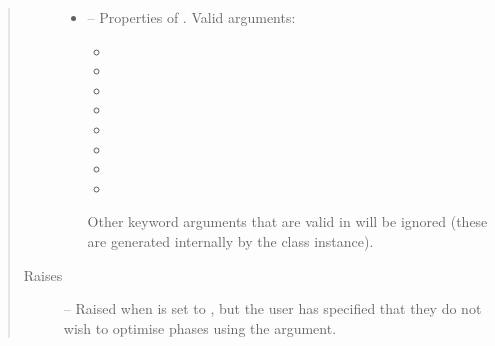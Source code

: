 \documentclass[letterpaper,10pt,english]{sphinxmanual}
\begin{document}
\begin{fulllineitems}
\begin{fulllineitems}
\begin{quote}
\begin{description}
\begin{itemize}
\item {} 
\sphinxAtStartPar
{} – 
\sphinxAtStartPar
Properties of {\hyperref[\detokenize{references/nlp/nlp:nmrespy.nlp.nlp.NonlinearProgramming}]{}}.
Valid arguments:
\begin{itemize}
\item {} 
\sphinxAtStartPar
{}

\item {} 
\sphinxAtStartPar
{}

\item {} 
\sphinxAtStartPar
{}

\item {} 
\sphinxAtStartPar
{}

\item {} 
\sphinxAtStartPar
{}

\item {} 
\sphinxAtStartPar
{}

\item {} 
\sphinxAtStartPar
{}

\item {} 
\sphinxAtStartPar
{}

\end{itemize}

\sphinxAtStartPar
Other keyword arguments that are valid in
{\hyperref[\detokenize{references/nlp/nlp:nmrespy.nlp.nlp.NonlinearProgramming}]{}} will be ignored
(these are generated internally by the class instance).


\end{itemize}

\item[{Raises}] \leavevmode
\sphinxAtStartPar
{\hyperref[\detokenize{references/errors:nmrespy._errors.PhaseVarianceAmbiguityError}]{}} – Raised when  is set to , but the user
    has specified that they do not wish to optimise phases using the
     argument.

\end{description}\end{quote}

\end{fulllineitems}
\end{fulllineitems}
\end{document}

